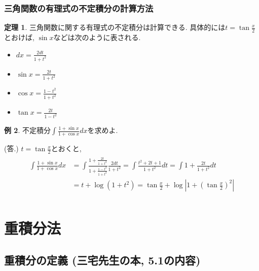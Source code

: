 \documentclass[dvipdfmx,a4paper,11pt]{article}
\theoremstyle{definition}
\newtheorem{thm}{定理}
\newtheorem{exa}[thm]{例}
\begin{document}
\subsubsection{三角関数の有理式の不定積分の計算方法}

\begin{tcolorbox}[
    colback = white,
    colframe = green!35!black,
    fonttitle = \bfseries,
    breakable = true]
    \begin{thm}
三角関数に関する有理式の不定積分は計算できる.
具体的には$t = \tan \frac{x}{2}$とおけば, $\sin x$などは次のように表される.
\begin{itemize}
    \setlength{\parskip}{0cm} 
  \setlength{\itemsep}{0cm} 
\item $dx = \frac{2 dt}{1+ t^2}$
\item $\sin x = \frac{2t}{1+ t^2}$
\item $\cos x = \frac{1 - t^2}{1+ t^2}$
\item $\tan x = \frac{2t}{1- t^2}$
\end{itemize}


        \end{thm}
    \end{tcolorbox}
    
\begin{exa}
不定積分$\int \frac{1 + \sin x}{1 + \cos x} dx$を求めよ.

\hspace{-18pt}(答.) $t = \tan \frac{x}{2}$とおくと, 
\begin{align*}
\begin{split}
\int \frac{1 + \sin x}{1 + \cos x} dx
&= \int \frac{1 + \frac{2t}{1+t^2} }{ 1+ \frac{1-t^2}{1+ t^2}} 
\frac{2dt}{1+ t^2} = \int \frac{t^2 + 2t + 1}{1+ t^2} dt = \int 1 +\frac{2t}{1+ t^2} dt \\
&= t + \log (1 + t^2) = \tan \frac{x}{2} + \log \left|1 + \left(\tan \frac{x}{2} \right)^2 \right|\\
\end{split}
\end{align*}

\end{exa}



\newpage

\section{重積分法}
\subsection{重積分の定義 (三宅先生の本, 5.1の内容)}
\end{document}
